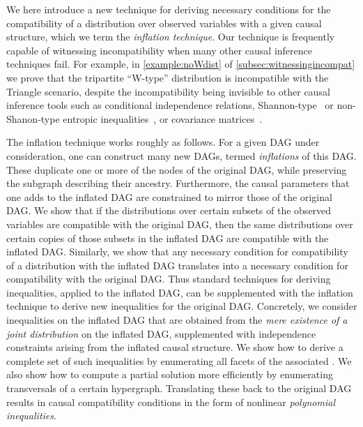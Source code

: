 We here introduce a new technique for deriving necessary conditions for the compatibility of a distribution over observed variables with a given causal structure, which we term the {\em inflation technique}. Our technique is frequently capable of witnessing incompatibility when many other causal inference techniques fail. For example, in \cref{example:noWdist} of \cref{subsec:witnessingincompat} we prove that the tripartite ``W-type'' distribution is incompatible with the Triangle scenario, despite the incompatibility being invisible to other causal inference tools such as conditional independence relations, Shannon-type~\cite{fritz2013marginal,chaves2014novel,chaves2014informationinference} or non-Shanon-type entropic inequalities~\cite{weilenmann2016entropic}, or covariance matrices~\cite{kela2016covariance}.


The inflation technique works roughly as follows. For a given DAG under consideration, one can construct many new DAGs, termed {\em inflations} of this DAG. These duplicate one or more of the nodes of the original DAG, while preserving the subgraph describing their ancestry.
Furthermore, the causal parameters that one adds to the inflated DAG are constrained to mirror those of the original DAG.  We show that if the distributions over certain subsets of the observed variables are compatible with the original DAG, then the same distributions over certain copies of those subsets in the inflated DAG are compatible with the inflated DAG.  Similarly, we show that any necessary condition for compatibility of a distribution with the inflated DAG translates into a necessary condition for compatibility with the original DAG.  Thus standard techniques for deriving inequalities, applied to the inflated DAG,  can be supplemented with the inflation technique to derive new inequalities for the original DAG.  Concretely, we consider inequalities on the inflated DAG that are obtained from the \emph{mere existence of a joint distribution} on the inflated DAG, supplemented with independence constraints arising from the inflated causal structure.   We show how to derive a complete set of such inequalities by enumerating all facets of the associated . We also show how to compute a partial solution more efficiently by enumerating transversals of a certain hypergraph. Translating these back to the original DAG results in causal compatibility conditions in the form of nonlinear \emph{polynomial inequalities}.

